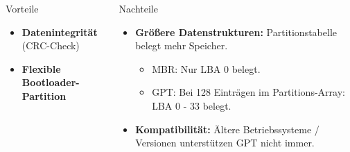 \begin{frame}
\begin{columns}[T]
\begin{column}{0.55\textwidth}
\begin{exampleblock}{Vorteile}
\begin{itemize}
                    \vspace{0.2cm}
                    \item \textbf{Datenintegrität} (CRC-Check)

                    \vspace{0.2cm}
                    \item \textbf{Flexible Bootloader-Partition}
                \end{itemize}
            \end{exampleblock}
        \end{column}

        \pause
        \begin{column}{0.4\textwidth}
            \begin{alertblock}{Nachteile}
                \begin{itemize}
                    \item \textbf{Größere Datenstrukturen:} Partitionstabelle belegt mehr Speicher.
                    \begin{itemize}
                        \item MBR: Nur LBA 0 belegt.
                        \item GPT: Bei 128 Einträgen im Partitions-Array: LBA 0 - 33 belegt.
                    \end{itemize}

                    \item \textbf{Kompatibilität:} Ältere Betriebssysteme / Versionen unterstützen GPT nicht immer.
                \end{itemize}
            \end{alertblock}
        \end{column}
    \end{columns}
\end{frame}
